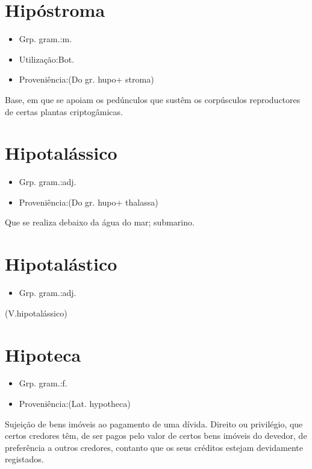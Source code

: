 \documentclass{article}
\begin{document}
\section{Hipóstroma}
\begin{itemize}
\item {Grp. gram.:m.}
\end{itemize}
\begin{itemize}
\item {Utilização:Bot.}
\end{itemize}
\begin{itemize}
\item {Proveniência:(Do gr. \textunderscore hupo\textunderscore  + \textunderscore stroma\textunderscore )}
\end{itemize}
Base, em que se apoiam os pedúnculos que sustêm os corpúsculos reproductores de certas plantas criptogâmicas.
\section{Hipotalássico}
\begin{itemize}
\item {Grp. gram.:adj.}
\end{itemize}
\begin{itemize}
\item {Proveniência:(Do gr. \textunderscore hupo\textunderscore  + \textunderscore thalassa\textunderscore )}
\end{itemize}
Que se realiza debaixo da água do mar; submarino.
\section{Hipotalástico}
\begin{itemize}
\item {Grp. gram.:adj.}
\end{itemize}
(V.hipotalássico)
\section{Hipoteca}
\begin{itemize}
\item {Grp. gram.:f.}
\end{itemize}
\begin{itemize}
\item {Proveniência:(Lat. \textunderscore hypotheca\textunderscore )}
\end{itemize}
Sujeição de bens imóveis ao pagamento de uma dívida.
Direito ou privilégio, que certos credores têm, de ser pagos pelo valor de certos bens imóveis do devedor, de preferência a outros credores, contanto que os seus créditos estejam devidamente registados.
\end{document}

